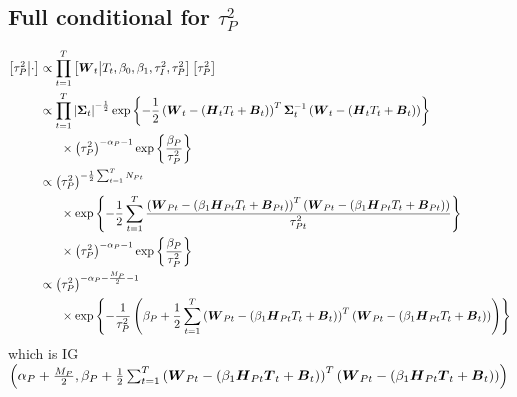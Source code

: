 \documentclass{article}\usepackage[]{graphicx}\usepackage[]{color}
\def\bm#1{\mbox{\boldmath $#1$}}
\begin{document}
\subsection{Full conditional for $\tau^2_P$}
%
\begin{align*}
%
\left[ \tau^2_P \middle| \cdot \right] & \propto \prod_{t = 1}^T \left[ \bm{W}_t \middle| T_t, \beta_0, \beta_1, \tau^2_I, \tau^2_P \right] \left[ \tau^2_P \right] \\
%
& \propto \prod_{t = 1}^T \left| \bm{\Sigma}_t \right|^{ - \frac{1} {2}} \exp{ \left\{ - \frac{1} {2} \left( \bm{W}_t - \left( \bm{H}_t T_t + \bm{B}_t \right) \right)^T \bm{\Sigma}_t^{ - 1} \left( \bm{W}_t - \left( \bm{H}_t T_t + \bm{B}_t \right) \right) \right\} }\\
& \hspace{6mm} \times \left( \tau^2_P \right)^{ - \alpha_P - 1 } \exp{ \left\{ \frac{\beta_P} {\tau^2_P} \right\} }\\
%
& \propto \left( \tau^2_P \right)^{ - \frac{1} {2} \sum_{t = 1}^T N_{Pt}}\\
& \hspace{6mm} \times \exp{ \left\{ - \frac{1} {2} \sum_{t = 1}^T \frac{ \left( \bm{W}_{Pt} - \left( \beta_1 \bm{H}_{Pt} T_t + \bm{B}_{Pt} \right) \right)^T \left( \bm{W}_{Pt} - \left( \beta_1 \bm{H}_{Pt} T_t + \bm{B}_{Pt} \right) \right) } {\tau^2_{Pt}} \right\} }\\
& \hspace{6mm} \times \left( \tau^2_P \right)^{ - \alpha_P - 1 } \exp{ \left\{ \frac{\beta_P} {\tau^2_P} \right\} }\\
%
& \propto \left( \tau^2_P \right)^{ - \alpha_P - \frac{M_P} {2} - 1 }\\
& \hspace{6mm} \times \exp{ \left\{ - \frac{1} {\tau^2_P} \left( \beta_P + \frac{1} {2} \sum_{t = 1}^T \left( \bm{W}_{Pt} - \left( \beta_1 \bm{H}_{Pt} T_t + \bm{B}_t \right) \right)^T \left( \bm{W}_{Pt} - \left( \beta_1 \bm{H}_{Pt} T_t  + \bm{B}_t \right) \right) \right) \right\} }\\
%
\end{align*}
%
which is IG$\left( \alpha_P + \frac{M_P} {2}, \beta_P + \frac{1} {2} \sum_{t = 1}^T \left( \bm{W}_{Pt} - \left( \beta_1 \bm{H}_{Pt} \bm{T}_t  + \bm{B}_t \right) \right)^T \left( \bm{W}_{Pt} - \left( \beta_1 \bm{H}_{Pt} \bm{T}_t  + \bm{B}_t \right) \right) \right)$
%
%
\end{document}
